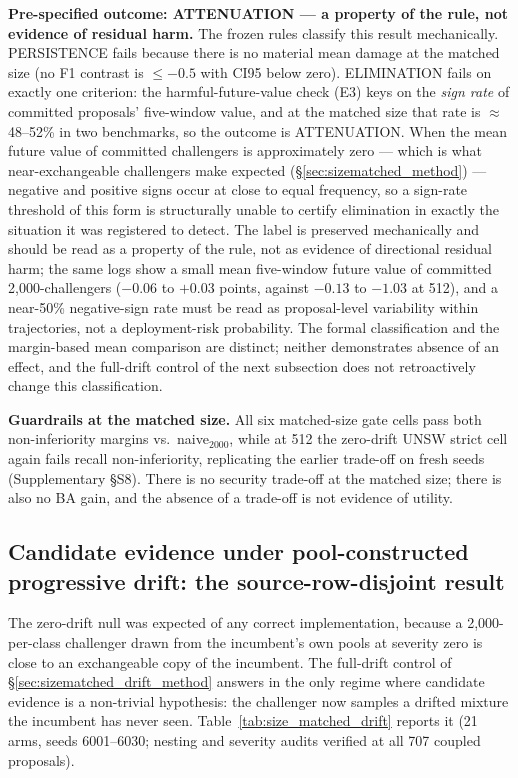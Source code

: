 \documentclass[a4paper,fleqn]{cas-sc}
\begin{document}


\textbf{Pre-specified outcome: ATTENUATION --- a property of the rule, not evidence of residual harm.} The frozen rules classify this result mechanically. PERSISTENCE fails because there is no material mean damage at the matched size (no F1 contrast is $\le -0.5$ with CI95 below zero). ELIMINATION fails on exactly one criterion: the harmful-future-value check (E3) keys on the \emph{sign rate} of committed proposals' five-window value, and at the matched size that rate is $\approx$48--52\% in two benchmarks, so the outcome is ATTENUATION. When the mean future value of committed challengers is approximately zero --- which is what near-exchangeable challengers make expected (\S\ref{sec:sizematched_method}) --- negative and positive signs occur at close to equal frequency, so a sign-rate threshold of this form is structurally unable to certify elimination in exactly the situation it was registered to detect. The label is preserved mechanically and should be read as a property of the rule, not as evidence of directional residual harm; the same logs show a small mean five-window future value of committed 2{,}000-challengers ($-0.06$ to $+0.03$ points, against $-0.13$ to $-1.03$ at 512), and a near-50\% negative-sign rate must be read as proposal-level variability within trajectories, not a deployment-risk probability. The formal classification and the margin-based mean comparison are distinct; neither demonstrates absence of an effect, and the full-drift control of the next subsection does not retroactively change this classification.

\textbf{Guardrails at the matched size.} All six matched-size gate cells pass both non-inferiority margins vs.\ naive$_{2000}$, while at 512 the zero-drift UNSW strict cell again fails recall non-inferiority, replicating the earlier trade-off on fresh seeds (Supplementary \S S8). There is no security trade-off at the matched size; there is also no BA gain, and the absence of a trade-off is not evidence of utility.

\subsection{Candidate evidence under pool-constructed progressive drift: the source-row-disjoint result}
\label{sec:sizematched_drift}

The zero-drift null was expected of any correct implementation, because a 2{,}000-per-class challenger drawn from the incumbent's own pools at severity zero is close to an exchangeable copy of the incumbent. The full-drift control of \S\ref{sec:sizematched_drift_method} answers in the only regime where candidate evidence is a non-trivial hypothesis: the challenger now samples a drifted mixture the incumbent has never seen. Table~\ref{tab:size_matched_drift} reports it (21 arms, seeds 6001--6030; nesting and severity audits verified at all 707 coupled proposals).
\end{document}
